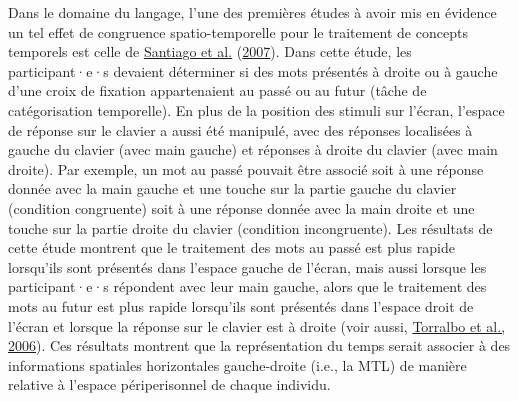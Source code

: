 \documentclass[
  a4paper,12pt,twoside,onecolumn,openright,final,oldfontcommands]{memoir}
\begin{document}
Dans le domaine du langage, l'une des premières études à avoir mis en évidence un tel effet de congruence spatio-temporelle pour le traitement de concepts temporels est celle de \protect\hyperlink{ref-santiago_time_2007}{Santiago et al.} (\protect\hyperlink{ref-santiago_time_2007}{2007}). Dans cette étude, les participant·e·s devaient déterminer si des mots présentés à droite ou à gauche d'une croix de fixation appartenaient au passé ou au futur (tâche de catégorisation temporelle). En plus de la position des stimuli sur l'écran, l'espace de réponse sur le clavier a aussi été manipulé, avec des réponses localisées à gauche du clavier (avec main gauche) et réponses à droite du clavier (avec main droite). Par exemple, un mot au passé pouvait être associé soit à une réponse donnée avec la main gauche et une touche sur la partie gauche du clavier (condition congruente) soit à une réponse donnée avec la main droite et une touche sur la partie droite du clavier (condition incongruente). Les résultats de cette étude montrent que le traitement des mots au passé est plus rapide lorsqu'ils sont présentés dans l'espace gauche de l'écran, mais aussi lorsque les participant·e·s répondent avec leur main gauche, alors que le traitement des mots au futur est plus rapide lorsqu'ils sont présentés dans l'espace droit de l'écran et lorsque la réponse sur le clavier est à droite (voir aussi, \protect\hyperlink{ref-torralbo_flexible_2006}{Torralbo et al., 2006}). Ces résultats montrent que la représentation du temps serait associer à des informations spatiales horizontales gauche-droite (i.e., la MTL) de manière relative à l'espace périperisonnel de chaque individu.
\end{document}
